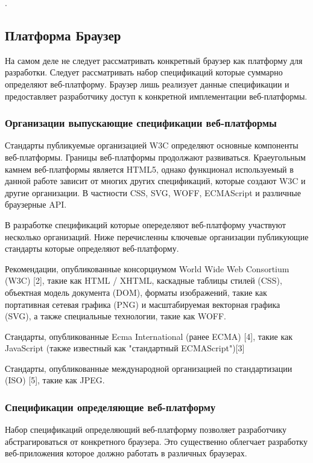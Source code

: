 .


\newpage

\subsection{Платформа Браузер}
На самом деле не следует рассматривать конкретный браузер как платформу для разработки. Следует рассматривать набор спецификаций которые суммарно определяют веб-платформу. Браузер лишь реализует данные спецификации и предоставляет разработчику доступ к конкретной имплементации веб-платформы.

\subsubsection{ Организации выпускающие спецификации веб-платформы}
Стандарты публикуемые организацией W3C определяют основные компоненты веб-платформы. Границы веб-платформы продолжают развиваться. Краеугольным камнем веб-платформы является HTML5, однако функционал используемый в данной работе зависит от многих других спецификаций, которые создают W3C и другие организации. В частности CSS, SVG, WOFF, ECMAScript и различные браузерные API.

В разработке спецификаций которые опеределяют веб-платформу участвуют несколько организаций. Ниже перечисленны ключевые организации публикующие стандарты которые определяют веб-платформу.

\begin{my_enumerate}
\item Рекомендации, опубликованные консорциумом World Wide Web Consortium (W3C) [2], такие как HTML / XHTML, каскадные таблицы стилей (CSS), объектная модель документа (DOM), форматы изображений, такие как портативная сетевая графика (PNG) и масштабируемая векторная графика (SVG), а также специальные технологии, такие как WOFF.
\item Стандарты, опубликованные Ecma International (ранее ECMA) [4], такие как JavaScript (также известный как "стандартный ECMAScript")[3]
\item Стандарты, опубликованные международной организацией по стандартизации (ISO) [5], такие как JPEG.
\end{my_enumerate}


\subsubsection{ Спецификации определяющие веб-платформу}
Набор спецификаций определяющий веб-платформу позволяет разработчику абстрагироваться от конкретного браузера. Это существенно облегчает разработку веб-приложения которое должно работать в различных браузерах.

